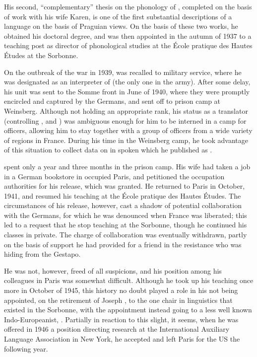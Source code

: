 His second, ``complementary'' thesis \citep{martinet37:danish} on the
phonology of , completed on the basis of work with his wife
Karen, is one of the first substantial 
descriptions of a language on
the basis of Praguian views. On the basis of these two works, he
obtained his doctoral degree, and was then appointed in the autumn of
1937 to a teaching post as director of phonological studies at the
École pratique des Hautes Études at the Sorbonne.

On the outbreak of the war in 1939, {\Martinet} was recalled to military
service, where he was designated as an interpreter of  (the only
one in the  army). After some delay, his unit was sent to the
Somme front in June of 1940, where they were promptly encircled and
captured by the Germans, and sent off to prison camp at
Weinsberg. Although not holding an appropriate rank, his status as a
translator (controlling ,  and ) was ambiguous
enough for him to be interned in a camp for officers, allowing him to
stay together with a group of officers from a wide variety of regions
in France. During his time in the Weinsberg camp, he took advantage of
this situation to collect data on  in spoken
 which he published as \citealt{martinet45:french}.

{\Martinet} spent only a year and three months in the prison camp. His
wife had taken a job in a {German} bookstore 
in occupied Paris, and
petitioned the occupation authorities for his release, which was
granted. He returned to Paris in October, 1941, and resumed his
teaching at the École pratique des Hautes Études. The circumstances of
his release, however, cast a shadow of potential collaboration with
the Germans, for which he was denounced when France was liberated;
this led to a request that he stop teaching at the Sorbonne, though he
continued his classes in private. The charge of collaboration was
eventually withdrawn, partly on the basis of support he had provided
for a friend in the resistance who was hiding from the Gestapo.

He was not, however, freed of all suspicions, and his position among
his colleagues in Paris was somewhat difficult. Although he took up
his teaching once more in October of 1945, this history no doubt
played a role in his not being appointed, on the retirement of Joseph
{\Vendryes}, to the one chair in linguistics that existed in the
Sorbonne, with the appointment instead going to a less well known
Indo-Europeanist, 
\citep{joseph16:martinet.weinreich}. Partially in reaction to this
slight, it seems, when he was offered in 1946 a position directing
research at the International Auxiliary Language Association in New
York, he accepted and left Paris for the US the following year.

